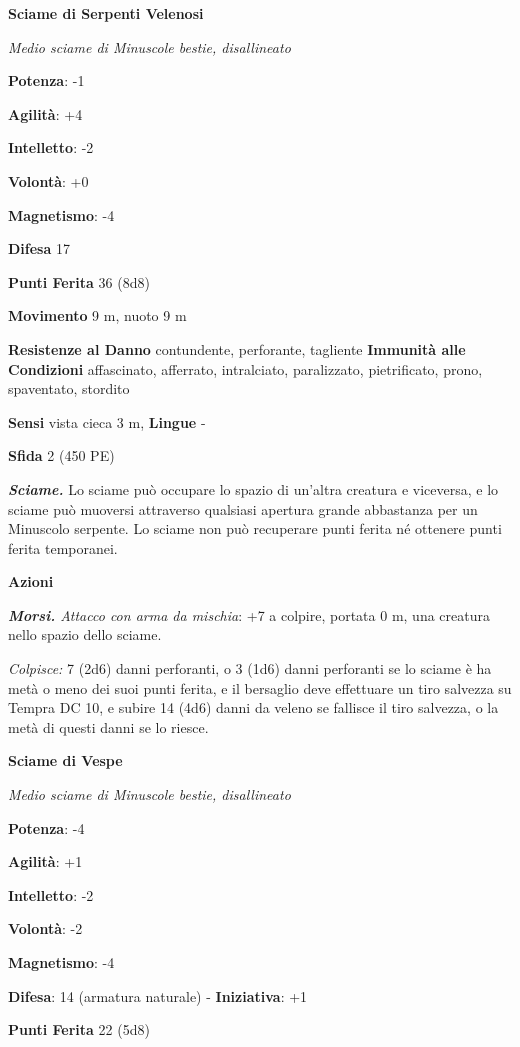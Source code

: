 \begin{multicols}{2}
\textbf{Sciame di Serpenti Velenosi}

\emph{Medio sciame di Minuscole bestie, disallineato}

\textbf{Potenza}: -1

\textbf{Agilità}: +4

\textbf{Intelletto}: -2

\textbf{Volontà}: +0

\textbf{Magnetismo}: -4

\textbf{Difesa} 17

\textbf{Punti Ferita} 36 (8d8)

\textbf{Movimento} 9 m, nuoto 9 m

\textbf{Resistenze al Danno} contundente, perforante, tagliente
\textbf{Immunità alle Condizioni} affascinato, afferrato, intralciato,
paralizzato, pietrificato, prono, spaventato, stordito

\textbf{Sensi} vista cieca 3 m,  \textbf{Lingue} -

\textbf{Sfida} 2 (450 PE)

\emph{\textbf{Sciame.}} Lo sciame può occupare lo spazio di un'altra
creatura e viceversa, e lo sciame può muoversi attraverso qualsiasi
apertura grande abbastanza per un Minuscolo serpente. Lo sciame non può
recuperare punti ferita né ottenere punti ferita temporanei.

\textbf{Azioni}

\emph{\textbf{Morsi.} Attacco con arma da mischia}: +7 a colpire,
portata 0 m, una creatura nello spazio dello sciame.

\emph{Colpisce:} 7 (2d6) danni perforanti, o 3 (1d6) danni perforanti se
lo sciame è ha metà o meno dei suoi punti ferita, e il bersaglio deve
effettuare un tiro salvezza su Tempra DC 10, e subire 14 (4d6)
danni da veleno se fallisce il tiro salvezza, o la metà di questi danni
se lo riesce.

\textbf{Sciame di Vespe}

\emph{Medio sciame di Minuscole bestie, disallineato}

\textbf{Potenza}: -4

\textbf{Agilità}: +1

\textbf{Intelletto}: -2

\textbf{Volontà}: -2

\textbf{Magnetismo}: -4

\textbf{Difesa}: 14 (armatura naturale) - \textbf{Iniziativa}: +1

\textbf{Punti Ferita} 22 (5d8)


\end{multicols}
